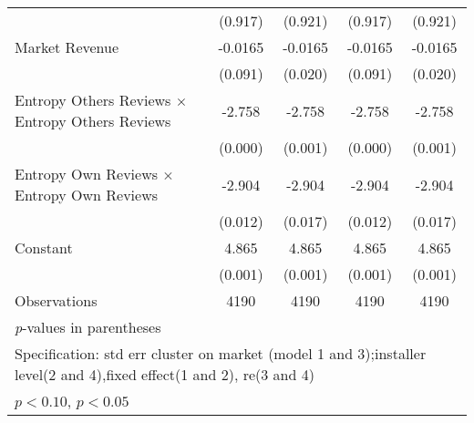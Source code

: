 {\begin{tabular}{l*{4}{c}}
                    &     (0.917)       &     (0.921)       &     (0.917)       &     (0.921)       \\
[1em]
Market Revenue      &     -0.0165\sym{+}&     -0.0165\sym{*}&     -0.0165\sym{+}&     -0.0165\sym{*}\\
                    &     (0.091)       &     (0.020)       &     (0.091)       &     (0.020)       \\
[1em]
Entropy Others Reviews $\times$ Entropy Others Reviews&      -2.758\sym{*}&      -2.758\sym{*}&      -2.758\sym{*}&      -2.758\sym{*}\\
                    &     (0.000)       &     (0.001)       &     (0.000)       &     (0.001)       \\
[1em]
Entropy Own Reviews $\times$ Entropy Own Reviews&      -2.904\sym{*}&      -2.904\sym{*}&      -2.904\sym{*}&      -2.904\sym{*}\\
                    &     (0.012)       &     (0.017)       &     (0.012)       &     (0.017)       \\
[1em]
Constant            &       4.865\sym{*}&       4.865\sym{*}&       4.865\sym{*}&       4.865\sym{*}\\
                    &     (0.001)       &     (0.001)       &     (0.001)       &     (0.001)       \\
\hline
Observations        &        4190       &        4190       &        4190       &        4190       \\
\hline\hline
\multicolumn{5}{l}{\footnotesize \textit{p}-values in parentheses}\\
\multicolumn{5}{l}{\footnotesize Specification: std err cluster on market (model 1 and 3);installer level(2 and 4),fixed effect(1 and 2), re(3 and 4) }\\
\multicolumn{5}{l}{\footnotesize \sym{+} \(p<0.10\), \sym{*} \(p<0.05\)}\\
\end{tabular}
}
